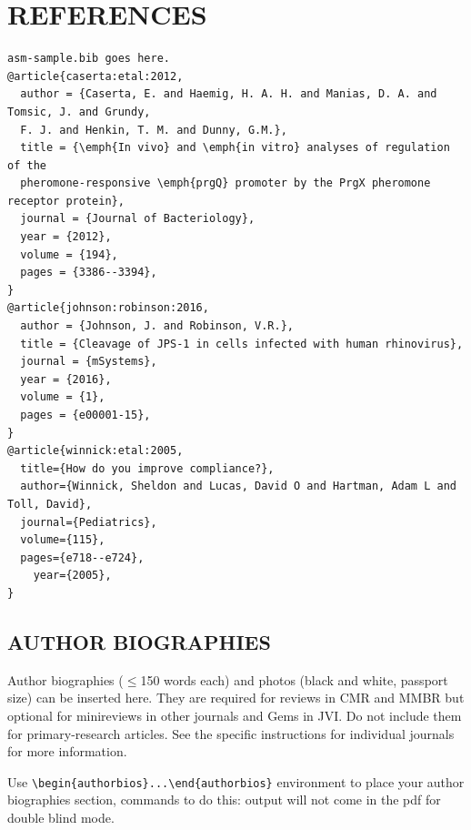 \documentclass{asmarticle}
\begin{document}
\section{REFERENCES}
\begin{verbatim}
asm-sample.bib goes here.
@article{caserta:etal:2012,
  author = {Caserta, E. and Haemig, H. A. H. and Manias, D. A. and Tomsic, J. and Grundy, 
  F. J. and Henkin, T. M. and Dunny, G.M.},
  title = {\emph{In vivo} and \emph{in vitro} analyses of regulation of the 
  pheromone-responsive \emph{prgQ} promoter by the PrgX pheromone receptor protein},
  journal = {Journal of Bacteriology},
  year = {2012},
  volume = {194},
  pages = {3386--3394},
}
@article{johnson:robinson:2016,
  author = {Johnson, J. and Robinson, V.R.},
  title = {Cleavage of JPS-1 in cells infected with human rhinovirus},
  journal = {mSystems},
  year = {2016},
  volume = {1},
  pages = {e00001-15},
}
@article{winnick:etal:2005,
  title={How do you improve compliance?},
  author={Winnick, Sheldon and Lucas, David O and Hartman, Adam L and Toll, David},
  journal={Pediatrics},
  volume={115},
  pages={e718--e724},
    year={2005},
}
\end{verbatim}

\begin{authorbios}
\section{AUTHOR BIOGRAPHIES}
	Author biographies ($\leq$150 words each) and photos (black and white, passport size) can be inserted here. They are required for reviews in CMR and MMBR but optional for minireviews in other journals and Gems in JVI. Do not include them for primary-research articles. See the specific instructions for individual journals for more information.

Use \verb|\begin{authorbios}...\end{authorbios}| environment to place your author biographies section, commands to do this: output will not come in the pdf for double blind mode.
\end{authorbios}
\end{document}
